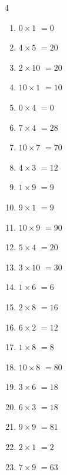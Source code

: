 \begin{multicols}{4}
\begin{enumerate}
  \item $0\times 1$
        $=0$

  \item $4\times 5$
        $=20$

  \item $2\times 10$
        $=20$

  \item $10\times 1$
        $=10$

  \item $0\times 4$
        $=0$

  \item $7\times 4$
        $=28$

  \item $10\times 7$
        $=70$

  \item $4\times 3$
        $=12$

  \item $1\times 9$
        $=9$

  \item $9\times 1$
        $=9$

  \item $10\times 9$
        $=90$

  \item $5\times 4$
        $=20$

  \item $3\times 10$
        $=30$

  \item $1\times 6$
        $=6$

  \item $2\times 8$
        $=16$

  \item $6\times 2$
        $=12$

  \item $1\times 8$
        $=8$

  \item $10\times 8$
        $=80$

  \item $3\times 6$
        $=18$

  \item $6\times 3$
        $=18$

  \item $9\times 9$
        $=81$

  \item $2\times 1$
        $=2$

  \item $7\times 9$
        $=63$


\end{enumerate}
\end{multicols}
